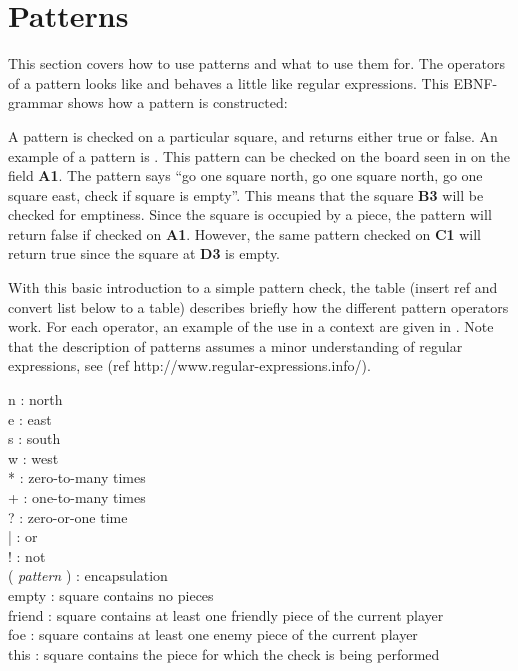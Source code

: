 \section{Patterns}
\label{sec:patterns}

This section covers how to use patterns and what to use them for. The operators of a pattern looks like and behaves a little like regular expressions. This EBNF-grammar shows how a pattern is constructed:

\begin{ebnf}
\end{ebnf}


A pattern is checked on a particular square, and returns either true or false. An example of a pattern is . This pattern can be checked on the board seen in  on the field \textbf{A1}. The pattern says ``go one square north, go one square north, go one square east, check if square is empty''. This means that the square \textbf{B3} will be checked for emptiness. Since the square is occupied by a piece, the pattern will return false if checked on \textbf{A1}. However, the same pattern checked on \textbf{C1} will return true since the square at \textbf{D3} is empty.

With this basic introduction to a simple pattern check, the table (insert ref and convert list below to a table) describes briefly how the different pattern operators work. For each operator, an example of the use in a context are given in . Note that the description of patterns assumes a minor understanding of regular expressions, see (ref http://www.regular-expressions.info/).

n : north \\
e : east \\
s : south \\
w : west \\
* : zero-to-many times\\
+ : one-to-many times\\
? : zero-or-one time\\
| : or\\
! : not\\
( \textit{pattern} ) : encapsulation\\
empty : square contains no pieces\\
friend :  square contains at least one friendly piece of the current player\\
foe : square contains at least one enemy piece of the current player\\
this : square contains the piece for which the check is being performed\\ 

